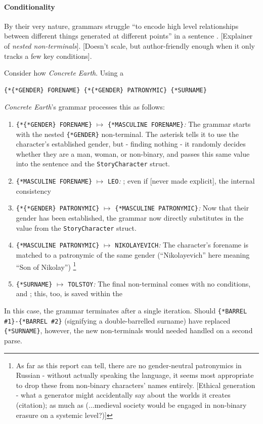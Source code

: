 \documentclass[a4paper, 11pt]{article}
\begin{document}
\begin{flushleft}
\paragraph{Conditionality} By their very nature, grammars struggle ``to encode high level relationships between different things generated at different points'' in a sentence \citep{cmptn19}. [Explainer of \textit{nested non-terminals}]. [Doesn't scale, but author-friendly enough when it only tracks a few key conditions].

\vspace{5pt}\noindent
Consider how \textit{Concrete Earth}. Using a 
\begin{center}
\begin{BVerbatim}
{*{*GENDER} FORENAME} {*{*GENDER} PATRONYMIC} {*SURNAME}
\end{BVerbatim}
\end{center}
\textit{Concrete Earth}'s grammar processes this as follows:
\begin{enumerate}[label=\textit{\arabic*}\textit{.}, noitemsep]
\item \verb|{*{*GENDER} FORENAME}| $\mapsto$ \verb|{*MASCULINE FORENAME}|\textit{:} The grammar starts with the nested \verb|{*GENDER}| non-terminal. The asterisk tells it to use the character's established gender, but - finding nothing - it randomly decides whether they are a man, woman, or non-binary, and passes this same value into the sentence and the \texttt{StoryCharacter} struct.
\item \verb|{*MASCULINE FORENAME}| $\mapsto$ \verb|LEO|\textit{:} ; even if [never made explicit], the internal consistency
\item \verb|{*{*GENDER} PATRONYMIC}| $\mapsto$ \verb|{*MASCULINE PATRONYMIC}|\textit{:} Now that their gender has been established, the grammar now directly substitutes in the value from the \texttt{StoryCharacter} struct.
\item \verb|{*MASCULINE PATRONYMIC}| $\mapsto$ \verb|NIKOLAYEVICH|\textit{:} The character's forename is matched to a patronymic of the same gender (``Nikolayevich'' here meaning ``Son of Nikolay'') \footnote{As far as this report can tell, there are no gender-neutral patronymics in Russian - without actually speaking the language, it seems most appropriate to drop these from non-binary characters' names entirely. [Ethical generation - what a generator might accidentally say about the worlds it creates (citation); as much as (...medieval society would be engaged in non-binary erasure on a systemic level?)]}
\item \verb|{*SURNAME}| $\mapsto$ \verb|TOLSTOY|\textit{:} The final non-terminal comes with no conditions, and ; this, too, is saved within the
\end{enumerate}
In this case, the grammar terminates after a single iteration. Should \verb|{*BARREL #1}-{*BARREL #2}| (signifying a double-barrelled surname) have replaced \verb|{*SURNAME}|, however, the new non-terminals would needed handled on a second parse.


\end{flushleft}
\end{document}
